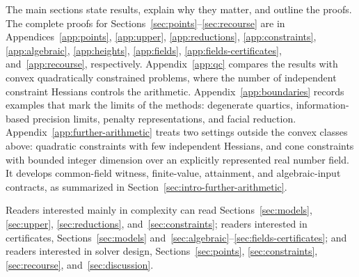 The main sections state results, explain why they matter, and outline the
proofs. The complete proofs for
Sections~\ref{sec:points}--\ref{sec:recourse} are in
Appendices~\ref{app:points}, \ref{app:upper}, \ref{app:reductions},
\ref{app:constraints}, \ref{app:algebraic}, \ref{app:heights},
\ref{app:fields}, \ref{app:fields-certificates}, and~\ref{app:recourse},
respectively.
Appendix~\ref{app:qc} compares the results with convex quadratically
constrained problems, where the number of independent constraint Hessians
controls the arithmetic. Appendix~\ref{app:boundaries} records examples that
mark the limits of the methods: degenerate quartics, information-based
precision limits, penalty representations, and facial reduction.
Appendix~\ref{app:further-arithmetic} treats two settings outside the convex
classes above: quadratic constraints with few independent Hessians, and
cone constraints with bounded integer dimension over an explicitly
represented real number field. It develops common-field witness, finite-value,
attainment, and algebraic-input contracts, as summarized in
Section~\ref{sec:intro-further-arithmetic}.

Readers interested mainly in complexity can read Sections~\ref{sec:models},
\ref{sec:upper}, \ref{sec:reductions}, and~\ref{sec:constraints}; readers
interested in certificates, Sections~\ref{sec:models}
and~\ref{sec:algebraic}--\ref{sec:fields-certificates}; and readers
interested in solver design, Sections~\ref{sec:points}, \ref{sec:constraints},
\ref{sec:recourse}, and~\ref{sec:discussion}.
